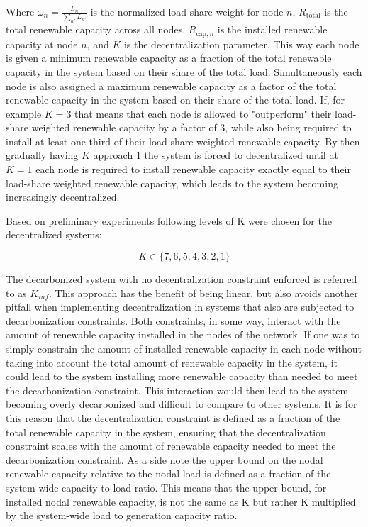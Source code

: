 \documentclass[preprint,12pt,nopreprintline]{elsarticle}
\begin{document}
\medskip
\noindent
Where $\omega_n = \frac{L_n}{\sum_{n'} L_{n'}}$ is the normalized load-share weight for node $n$, $R_{\text{total}}$ is the total renewable capacity across all nodes, $R_{\text{cap},n}$ is the installed renewable capacity at node $n$, and $K$ is the decentralization parameter. This way each node is given a minimum renewable capacity as a fraction of the total renewable capacity in the system based on their share of the total load. Simultaneously each node is also assigned a maximum renewable capacity as a factor of the total renewable capacity in the system based on their share of the total load. If, for example $K=3$ that means that each node is allowed to "outperform" their load-share weighted renewable capacity by a factor of 3, while also being required to install at least one third of their load-share weighted renewable capacity. By then gradually having $K$ approach 1 the system is forced to decentralized until at $K=1$ each node is required to install renewable capacity exactly equal to their load-share weighted renewable capacity, which leads to the system becoming increasingly decentralized.

\medskip
\noindent
Based on preliminary experiments following levels of K were chosen for the decentralized systems:

\begin{equation}
K \in \{7, 6, 5, 4, 3, 2, 1\}
\label{K_levels}
\end{equation}  

\medskip
\noindent
The decarbonized system with no decentralization constraint enforced is referred to as $K_{inf}$. This approach has the benefit of being linear, but also avoids another pitfall when implementing decentralization in systems that also are subjected to decarbonization constraints. Both constraints, in some way, interact with the amount of renewable capacity installed in the nodes of the network. If one was to simply constrain the amount of installed renewable capacity in each node without taking into account the total amount of renewable capacity in the system, it could lead to the system installing more renewable capacity than needed to meet the decarbonization constraint. This interaction would then lead to the system becoming overly decarbonized and difficult to compare to other systems. It is for this reason that the decentralization constraint is defined as a fraction of the total renewable capacity in the system, ensuring that the decentralization constraint scales with the amount of renewable capacity needed to meet the decarbonization constraint.  As a side note the upper bound on the nodal renewable capacity relative to the nodal load is defined as a fraction of the system wide-capacity to load ratio. This means that the upper bound, for installed nodal renewable capacity, is not the same as K but rather K multiplied by the system-wide load to generation capacity ratio.
\end{document}

